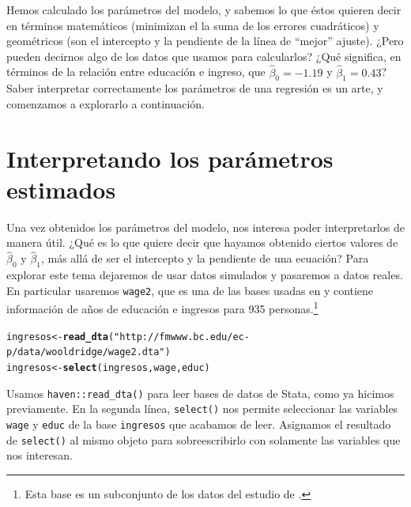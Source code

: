 \documentclass{report}\usepackage[]{graphicx}\usepackage[]{color}
\makeatletter
\newcommand{\hlstr}[1]{\textcolor[rgb]{0.192,0.494,0.8}{#1}}%
\newcommand{\hlstd}[1]{\textcolor[rgb]{0.345,0.345,0.345}{#1}}%
\newcommand{\hlkwb}[1]{\textcolor[rgb]{0.69,0.353,0.396}{#1}}%
\newcommand{\hlkwd}[1]{\textcolor[rgb]{0.737,0.353,0.396}{\textbf{#1}}}%
\newenvironment{kframe}{%
 \def\at@end@of@kframe{}%
 \ifinner\ifhmode%
  \def\at@end@of@kframe{\end{minipage}}%
  \begin{minipage}{\columnwidth}%
 \fi\fi%
 \def\FrameCommand##1{\hskip\@totalleftmargin \hskip-\fboxsep
 \colorbox{shadecolor}{##1}\hskip-\fboxsep
     \hskip-\linewidth \hskip-\@totalleftmargin \hskip\columnwidth}%
 \MakeFramed {\advance\hsize-\width
   \@totalleftmargin\z@ \linewidth\hsize
   \@setminipage}}%
 {\par\unskip\endMakeFramed%
 \at@end@of@kframe}
\newenvironment{knitrout}{}{} %
\makeatother
\begin{document}

Hemos calculado los parámetros del modelo, y sabemos lo que éstos quieren decir en términos matemáticos (minimizan el la suma de los errores cuadráticos) y geométricos (son el intercepto y la pendiente de la línea de ``mejor'' ajuste).
¿Pero pueden decirnos algo de los datos que usamos para calcularlos?
¿Qué significa, en términos de la relación entre educación e ingreso, que $\hat \beta_0 = -1.19$ y $\hat \beta_1 = 0.43$?
Saber interpretar correctamente los parámetros de una regresión es un arte, y comenzamos a explorarlo a continuación.


\section{Interpretando los parámetros estimados}

Una vez obtenidos los parámetros del modelo, nos interesa poder interpretarlos de manera útil. ¿Qué es lo que quiere decir que hayamos obtenido ciertos valores de $\hat\beta_0$ y $\hat\beta_1$, más allá de ser el intercepto y la pendiente de una ecuación?
Para explorar este tema dejaremos de usar datos simulados y pasaremos a datos reales.
En particular usaremos \verb|wage2|, que es una de las bases usadas en \textcite{wooldridge_introductory_2016} y contiene información de años de educación e ingresos para 935 personas.\footnote{Esta base es un subconjunto de los datos del estudio de \textcite{blackburn_unobserved_1992}.}

\begin{knitrout}
\color{fgcolor}\begin{kframe}
\begin{alltt}
\hlstd{ingresos} \hlkwb{<-} \hlkwd{read_dta}\hlstd{(}\hlstr{"http://fmwww.bc.edu/ec-p/data/wooldridge/wage2.dta"}\hlstd{)}
\hlstd{ingresos} \hlkwb{<-} \hlkwd{select}\hlstd{(ingresos, wage, educ)}
\end{alltt}
\end{kframe}
\end{knitrout}

\begin{Rbox}
Usamos \verb|haven::read_dta()| para leer bases de datos de Stata, como ya hicimos previamente. En la segunda línea, \verb|select()| nos permite seleccionar las variables \verb|wage| y \verb|educ| de la base \verb|ingresos| que acabamos de leer. Asignamos el resultado de \verb|select()| al mismo objeto para sobreescribirlo con solamente las variables que nos interesan.
\end{Rbox}
\end{document}
